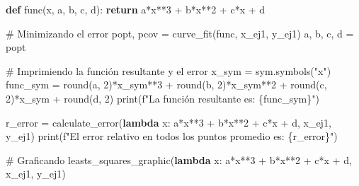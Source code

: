 \documentclass[
  letterpaper,
  DIV=11,
  numbers=noendperiod]{scrartcl}
\newenvironment{Shaded}{\begin{snugshade}}{\end{snugshade}}
\newcommand{\BuiltInTok}[1]{\textcolor[rgb]{0.00,0.23,0.31}{#1}}
\newcommand{\CommentTok}[1]{\textcolor[rgb]{0.37,0.37,0.37}{#1}}
\newcommand{\ControlFlowTok}[1]{\textcolor[rgb]{0.00,0.23,0.31}{\textbf{#1}}}
\newcommand{\DecValTok}[1]{\textcolor[rgb]{0.68,0.00,0.00}{#1}}
\newcommand{\KeywordTok}[1]{\textcolor[rgb]{0.00,0.23,0.31}{\textbf{#1}}}
\newcommand{\NormalTok}[1]{\textcolor[rgb]{0.00,0.23,0.31}{#1}}
\newcommand{\OperatorTok}[1]{\textcolor[rgb]{0.37,0.37,0.37}{#1}}
\newcommand{\SpecialCharTok}[1]{\textcolor[rgb]{0.37,0.37,0.37}{#1}}
\newcommand{\SpecialStringTok}[1]{\textcolor[rgb]{0.13,0.47,0.30}{#1}}
\newcommand{\StringTok}[1]{\textcolor[rgb]{0.13,0.47,0.30}{#1}}
\begin{document}
\begin{Shaded}
\begin{Highlighting}[]

\KeywordTok{def}\NormalTok{ func(x, a, b, c, d):}
    \ControlFlowTok{return}\NormalTok{ a}\OperatorTok{*}\NormalTok{x}\OperatorTok{**}\DecValTok{3} \OperatorTok{+}\NormalTok{ b}\OperatorTok{*}\NormalTok{x}\OperatorTok{**}\DecValTok{2} \OperatorTok{+}\NormalTok{ c}\OperatorTok{*}\NormalTok{x }\OperatorTok{+}\NormalTok{ d}

\CommentTok{\# Minimizando el error}
\NormalTok{popt, pcov }\OperatorTok{=}\NormalTok{ curve\_fit(func, x\_ej1, y\_ej1)}
\NormalTok{a, b, c, d }\OperatorTok{=}\NormalTok{ popt}

\CommentTok{\# Imprimiendo la función resultante y el error}
\NormalTok{x\_sym }\OperatorTok{=}\NormalTok{ sym.symbols(}\StringTok{"x"}\NormalTok{)}
\NormalTok{func\_sym }\OperatorTok{=} \BuiltInTok{round}\NormalTok{(a, }\DecValTok{2}\NormalTok{)}\OperatorTok{*}\NormalTok{x\_sym}\OperatorTok{**}\DecValTok{3} \OperatorTok{+} \BuiltInTok{round}\NormalTok{(b, }\DecValTok{2}\NormalTok{)}\OperatorTok{*}\NormalTok{x\_sym}\OperatorTok{**}\DecValTok{2} \OperatorTok{+} \BuiltInTok{round}\NormalTok{(c, }\DecValTok{2}\NormalTok{)}\OperatorTok{*}\NormalTok{x\_sym }\OperatorTok{+} \BuiltInTok{round}\NormalTok{(d, }\DecValTok{2}\NormalTok{)}
\BuiltInTok{print}\NormalTok{(}\SpecialStringTok{f"La función resultante es: }\SpecialCharTok{\{}\NormalTok{func\_sym}\SpecialCharTok{\}}\SpecialStringTok{"}\NormalTok{)}

\NormalTok{r\_error }\OperatorTok{=}\NormalTok{ calculate\_error(}\KeywordTok{lambda}\NormalTok{ x: a}\OperatorTok{*}\NormalTok{x}\OperatorTok{**}\DecValTok{3} \OperatorTok{+}\NormalTok{ b}\OperatorTok{*}\NormalTok{x}\OperatorTok{**}\DecValTok{2} \OperatorTok{+}\NormalTok{ c}\OperatorTok{*}\NormalTok{x }\OperatorTok{+}\NormalTok{ d, x\_ej1, y\_ej1)}
\BuiltInTok{print}\NormalTok{(}\SpecialStringTok{f"El error relativo en todos los puntos promedio es: }\SpecialCharTok{\{}\NormalTok{r\_error}\SpecialCharTok{\}}\SpecialStringTok{"}\NormalTok{)}

\CommentTok{\# Graficando}
\NormalTok{leasts\_squares\_graphic(}\KeywordTok{lambda}\NormalTok{ x: a}\OperatorTok{*}\NormalTok{x}\OperatorTok{**}\DecValTok{3} \OperatorTok{+}\NormalTok{ b}\OperatorTok{*}\NormalTok{x}\OperatorTok{**}\DecValTok{2} \OperatorTok{+}\NormalTok{ c}\OperatorTok{*}\NormalTok{x }\OperatorTok{+}\NormalTok{ d, x\_ej1, y\_ej1)}
\end{Highlighting}
\end{Shaded}
\end{document}
